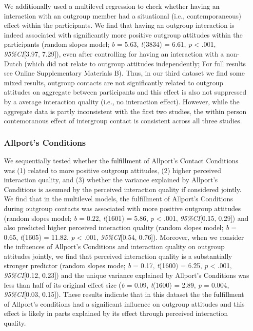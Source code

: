 We additionally used a multilevel regression to check whether having an
interaction with an outgroup member had a situational (i.e.,
contemporaneous) effect within the participants. We find that having an
outgroup interaction is indeed associated with significantly more
positive outgroup attitudes within the participants (random slopes
model; \textit{b} = 5.63, \textit{t}(3834) = 6.61, \textit{p}
\textless{} .001, \textit{95\%CI}{[}3.97, 7.29{]}), even after
controlling for having an interaction with a non-Dutch (which did not
relate to outgroup attitudes independently; For full results see Online
Supplementary Materials B). Thus, in our third dataset we find some
mixed results, outgroup contacts are not significantly related to
outgroup attitudes on aggregate between participants and this effect is
also not suppressed by a average interaction quality (i.e., no
interaction effect). However, while the aggregate data is partly
inconsistent with the first two studies, the within person contemoranous
effect of intergroup contact is consistent across all three studies.

\subsubsection{Allport's Conditions}

We sequentially tested whether the fulfillment of Allport's Contact
Conditions was (1) related to more positive outgroup attitudes, (2)
higher perceived interaction quality, and (3) whether the variance
explained by Allport's Conditions is assumed by the perceived
interaction quality if considered jointly. We find that in the
multilevel models, the fulfillment of Allport's Conditions during
outgroup contacts was associated with more positive outgroup attitudes
(random slopes model; \textit{b} = 0.22, \textit{t}(1601) = 5.86,
\textit{p} \textless{} .001, \textit{95\%CI}{[}0.15, 0.29{]}) and also
predicted higher perceived interaction quality (random slopes model;
\textit{b} = 0.65, \textit{t}(1605) = 11.82, \textit{p} \textless{}
.001, \textit{95\%CI}{[}0.54, 0.76{]}). Moreover, when we consider the
influences of Allport's Conditions and interaction quality on outgroup
attitudes jointly, we find that perceived interaction quality is a
substantially stronger predictor (random slopes mode; \textit{b} = 0.17,
\textit{t}(1600) = 6.25, \textit{p} \textless{} .001,
\textit{95\%CI}{[}0.12, 0.23{]}) and the unique variance explained by
Allport's Conditions was less than half of its original effect size
(\textit{b} = 0.09, \textit{t}(1600) = 2.89, \textit{p} = 0.004,
\textit{95\%CI}{[}0.03, 0.15{]}). These results indicate that in this
dataset the the fulfillment of Allport's conditions had a significant
influence on outgroup attitudes and this effect is likely in parts
explained by its effect through perceived interaction quality.

